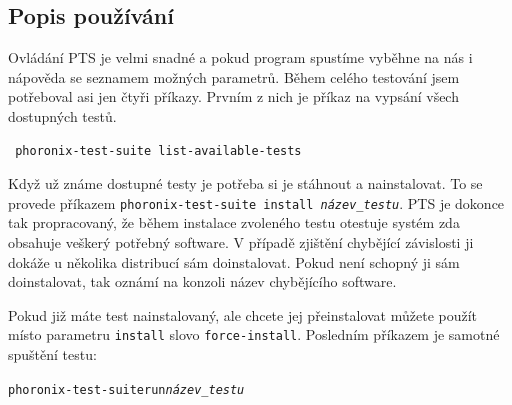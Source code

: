 \subsection{Popis používání}
Ovládání PTS je velmi snadné a pokud program spustíme vyběhne na nás i nápověda se seznamem možných parametrů. Během celého testování jsem potřeboval asi jen čtyři příkazy. Prvním z nich je příkaz na vypsání všech dostupných testů.
\begin{verbatim}
 phoronix-test-suite list-available-tests
\end{verbatim}
Když už známe dostupné testy je potřeba si je stáhnout a nainstalovat. To se provede příkazem \texttt{phoronix-test-suite install \textit{název\_testu}}. PTS je dokonce tak propracovaný, že během instalace zvoleného testu otestuje systém zda obsahuje veškerý potřebný software. V případě zjištění chybějící závislosti ji dokáže u několika distribucí sám doinstalovat. Pokud není schopný ji sám doinstalovat, tak oznámí na konzoli název chybějícího software.

Pokud již máte test nainstalovaný, ale chcete jej přeinstalovat můžete použít místo parametru \texttt{install} slovo \texttt{force-install}. Posledním příkazem je samotné spuštění testu:
\begin{alltt}
 phoronix-test-suite run \emph{název\_testu}
\end{alltt}

